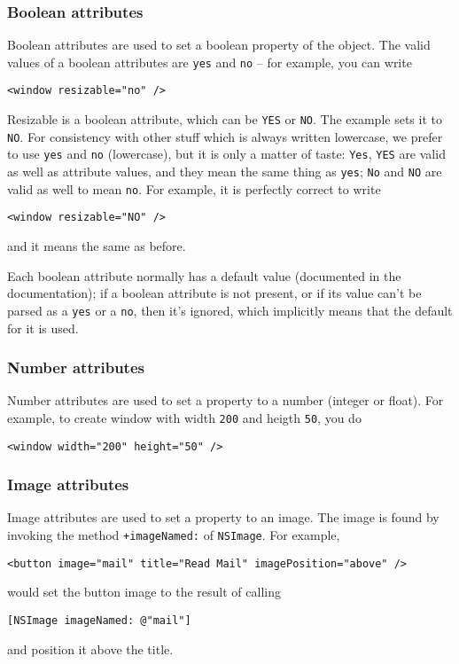 \subsubsection{Boolean attributes}
Boolean attributes are used to set a boolean property of the object.
The valid values of a boolean attributes are \texttt{yes} and
\texttt{no} -- for example, you can write
\begin{verbatim}
<window resizable="no" />
\end{verbatim}
Resizable is a boolean attribute, which can be \texttt{YES} or
\texttt{NO}.  The example sets it to \texttt{NO}.  For consistency 
with other stuff which is always written lowercase, we prefer to use
\texttt{yes} and \texttt{no} (lowercase), but it is only a matter of taste: 
\texttt{Yes}, \texttt{YES} are valid as well as attribute values, and they
mean the same thing as \texttt{yes}; \texttt{No} and \texttt{NO} are
valid as well to mean \texttt{no}.  For example, it is perfectly
correct to write
\begin{verbatim}
<window resizable="NO" />
\end{verbatim}
and it means the same as before.

Each boolean attribute normally has a default value (documented in the
documentation); if a boolean attribute is not present, or if its value
can't be parsed as a \texttt{yes} or a \texttt{no}, then it's ignored,
which implicitly means that the default for it is used.

\subsubsection{Number attributes}
Number attributes are used to set a property to a number (integer or
float).  For example, to create window with width \texttt{200} and 
heigth \texttt{50}, you do
\begin{verbatim}
<window width="200" height="50" />
\end{verbatim}

\subsubsection{Image attributes}
Image attributes are used to set a property to an image.  The image is
found by invoking the method \texttt{+imageNamed:} of
\texttt{NSImage}.  For example,
\begin{verbatim}
<button image="mail" title="Read Mail" imagePosition="above" />
\end{verbatim}
would set the button image to the result of calling 
\begin{verbatim}
[NSImage imageNamed: @"mail"]
\end{verbatim}
and position it above the title.

